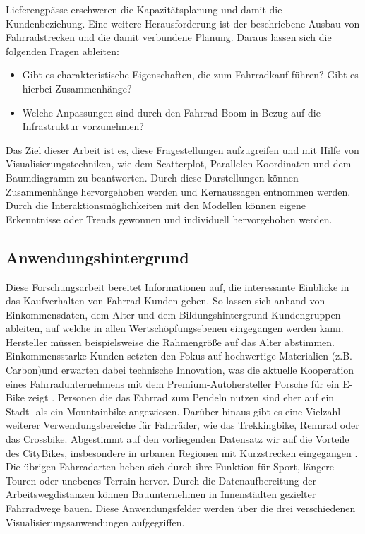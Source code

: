 \documentclass[usegeometry=true]{scrartcl}
\begin{document}
Lieferengpässe erschweren die Kapazitätsplanung und damit die Kundenbeziehung. Eine weitere Herausforderung ist der beschriebene Ausbau von Fahrradstrecken und die damit verbundene Planung. Daraus lassen sich die folgenden Fragen ableiten:
\begin{itemize}
\item Gibt es charakteristische Eigenschaften, die zum Fahrradkauf führen? Gibt es hierbei Zusammenhänge?
\item Welche Anpassungen sind durch den Fahrrad-Boom in Bezug auf die Infrastruktur vorzunehmen?
\end{itemize}
Das Ziel dieser Arbeit ist es, diese Fragestellungen  aufzugreifen und mit Hilfe von Visualisierungstechniken, wie dem Scatterplot, Parallelen Koordinaten und dem Baumdiagramm zu beantworten. Durch diese Darstellungen können Zusammenhänge hervorgehoben werden und Kernaussagen entnommen werden. Durch die Interaktionsmöglichkeiten mit den Modellen können eigene Erkenntnisse oder Trends gewonnen und individuell hervorgehoben werden.    

\subsection{Anwendungshintergrund}


Diese Forschungsarbeit bereitet Informationen auf, die interessante Einblicke in das Kaufverhalten von Fahrrad-Kunden geben. So lassen sich anhand von Einkommensdaten, dem Alter und dem Bildungshintergrund Kundengruppen ableiten, auf welche in allen Wertschöpfungsebenen eingegangen werden kann. Hersteller müssen beispielsweise die Rahmengröße auf das Alter abstimmen. Einkommensstarke Kunden setzten den Fokus auf hochwertige Materialien (z.B. Carbon)und erwarten dabei technische Innovation, was die aktuelle Kooperation eines Fahrradunternehmens mit dem Premium-Autohersteller Porsche für ein E-Bike zeigt \cite{Nachrichten.31.08.2021}. Personen die das Fahrrad zum Pendeln nutzen sind eher auf ein Stadt- als ein Mountainbike angewiesen. Darüber hinaus gibt es eine Vielzahl weiterer  Verwendungsbereiche für Fahrräder, wie das Trekkingbike, Rennrad oder das Crossbike. Abgestimmt auf den vorliegenden Datensatz wir auf die Vorteile des CityBikes, insbesondere in urbanen Regionen mit Kurzstrecken eingegangen \cite{.04.09.2021}. Die übrigen Fahrradarten heben sich durch ihre Funktion für Sport, längere Touren oder unebenes Terrain hervor. 
Durch die Datenaufbereitung der Arbeitswegdistanzen können Bauunternehmen in Innenstädten gezielter Fahrradwege bauen. Diese Anwendungsfelder werden über die drei verschiedenen Visualisierungsanwendungen aufgegriffen. 
\end{document}
